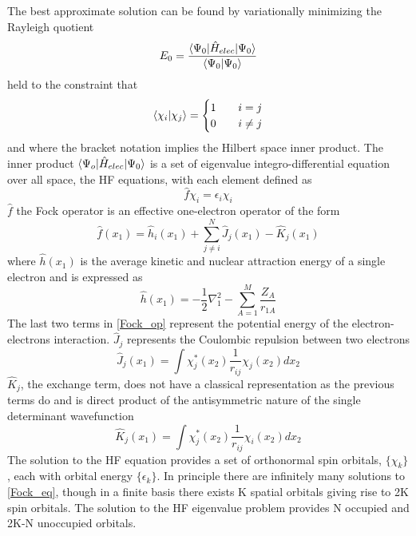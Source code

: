     The best approximate solution can be found by variationally minimizing the Rayleigh quotient
      \begin{equation}
      E_{0} = \frac{\langle\Psi_{0} | \hat{H}_{elec} | \Psi_{0} \rangle}{\langle\Psi_{0}|\Psi_{0}\rangle}
      \end{equation}
    held to the constraint that
      \begin{equation}
        \langle \chi_i|\chi_j\rangle = 
          \begin{cases}
          1  & \quad i=j\\
          0  & \quad i\neq j
          \end{cases}
      \end{equation}
    and where the bracket notation implies the Hilbert space inner product.  The inner product $\langle\Psi_{o} | \hat{H}_{elec} | \Psi_{0} \rangle$ is a set of eigenvalue integro-differential equation over all space, the HF equations, with each element defined as 
      \begin{equation} \label{Fock_eq}
      \hat{f}\chi_i = \epsilon_i \chi_i
      \end{equation}
    $\hat{f}$ the Fock operator is an effective one-electron operator of the form 
      \begin{equation} \label{Fock_op}
      \hat{f}(x_1) = \hat{h}_i(x_1)  + \sum_{j\neq i}^N \hat{J}_j(x_1) - \hat{K}_j(x_1)
      \end{equation}
    where $\hat{h}(x_1)$ is the average kinetic and nuclear attraction energy of a single electron and is expressed as 
      \begin{equation} \label{h}
      \hat{h}(x_1) = -\frac{1}{2} \nabla_1^2 - \sum_{A=1}^M \frac{Z_A}{r_{1A}}
      \end{equation}
    The last two terms in \cref{Fock_op} represent the potential energy of the electron-electrons interaction. $\hat{J}_j$ represents the Coulombic repulsion between two electrons
      \begin{equation} \label{j}
      \hat{J}_j(x_1) = \int \chi_j^*(x_2) \frac{1}{r_{ij}} \chi_j(x_2) dx_2
      \end{equation}
    $\hat{K}_j$, the exchange term, does not have a classical representation as the previous terms do and is direct product of the antisymmetric nature of the single determinant wavefunction
      \begin{equation} \label{k}
      \hat{K}_j(x_1) = \int \chi_j^*(x_2) \frac{1}{r_{ij}} \chi_i(x_2) dx_2
      \end{equation}
    The solution to the HF equation provides a set of orthonormal spin orbitals, $\{ \chi_k \}$, each with orbital energy $\{\epsilon_k\}$.  In principle there are infinitely many solutions to \cref{Fock_eq}, though in a finite basis there exists K spatial orbitals giving rise to 2K spin orbitals.  The solution to the HF eigenvalue problem provides N occupied and 2K-N unoccupied orbitals.
    
